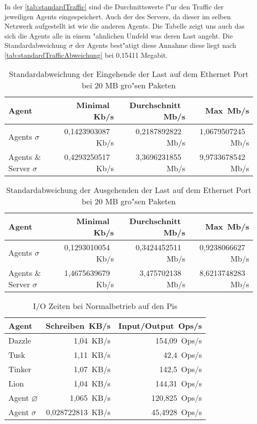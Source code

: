 In der \cref{tab:standardTraffic} sind die Durchnittswerte f"ur den Traffic der jeweiligen Agents eingespeichert. Auch der %
des Servers, da dieser im selben Netzwerk aufgestellt ist wie die anderen Agents. Die Tabelle zeigt uns auch %
das sich die Agents alle in einem "ahnlichen Umfeld was deren Last angeht. Die Standardabweichung $\sigma$ der Agents %
best"atigt diese Annahme diese liegt nach \cref{tab:standardTrafficAbweichung} bei 0,15411 Megabit.     

\begin{table}
\centering
\begin{tabular}{l%
 r<{\,Kb/s}%
 r<{\,Mb/s}%
 r<{\,Mb/s}%
}
Agent				& Minimal		& Durchschnitt          & Max		\\
\hline
Agents $\sigma $		& 0,1423903087		& 0,2187892822		& 1,0679507245	\\
Agents \& Server $\sigma $	& 0,4293250517		& 3,3696231855        	& 9,9733678542 	\\
\end{tabular}
\caption{Standardabweichung der Eingehende der Last auf dem Ethernet Port bei 20 MB gro"sen Paketen }
\label{tab:standardTrafficAbweichungEingehend200MB}
\end{table}


\begin{table}
\centering
\begin{tabular}{l%
 r<{\,Kb/s}%
 r<{\,Mb/s}%
 r<{\,Mb/s}%
}
Agent				& Minimal		& Durchschnitt          & Max		\\
\hline
Agents $\sigma $		& 0,1293010054	 	& 0,3424452511		& 0,9238066627	\\
Agents \& Server $\sigma $	& 1,4675639679		& 3,475702138       	& 8,6213748283 	\\
\end{tabular}
\caption{Standardabweichung der Ausgehenden der Last auf dem Ethernet Port bei 20 MB gro"sen Paketen }
\label{tab:standardTrafficAbweichungAusgehend200Mb}
\end{table}


\begin{table}
\centering
\begin{tabular}{l%
 r<{\,KB/s}%
 r<{\,Ops/s}%
}
Agent	  			& Schreiben	 	& Input/Output 	\\	
\hline
Dazzle 				& 1,04			& 154,09	        \\
Tusk 				& 1,11			& 42,4			\\
Tinker				& 1,07 			& 142,5		 	\\
Lion				& 1,04			& 144,31	 	\\
Agent $\diameter $  		& 1,065			& 120,825		\\   
Agent $\sigma $ 		& 0,028722813  		& 45,4928		\\
\end{tabular}
\caption{I/O Zeiten bei Normalbetrieb auf den Pis}
\label{tab:NormalbetriebIoStat200MB}
\end{table}


